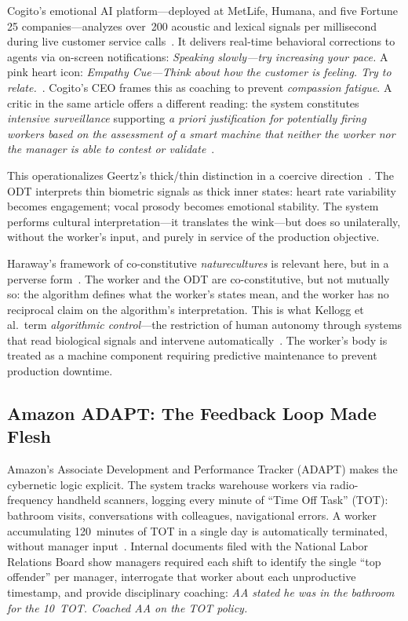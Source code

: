 \documentclass[runningheads]{llncs}
\begin{document}
Cogito's emotional AI platform---deployed at MetLife, Humana, and five Fortune
25 companies---analyzes over~200 acoustic and lexical signals per millisecond
during live customer service calls~\cite{cxtoday2022cogito,cogitostex2025}. It
delivers real-time behavioral corrections to agents via on-screen
notifications: \emph{Speaking slowly---try increasing your pace.} A pink heart
icon: \emph{Empathy Cue---Think about how the customer is feeling. Try to
relate.}~\cite{timecogito2019}. Cogito's CEO frames this as coaching to prevent
\emph{compassion fatigue}. A critic in the same article offers a different
reading: the system constitutes \emph{intensive surveillance} supporting
\emph{a priori justification for potentially firing workers based on the
assessment of a smart machine that neither the worker nor the manager is able to
contest or validate}~\cite{timecogito2019}.

This operationalizes Geertz's thick/thin distinction in a coercive
direction~\cite{geertz1973interpretation}. The ODT interprets thin biometric
signals as thick inner states: heart rate variability becomes engagement; vocal
prosody becomes emotional stability. The system performs cultural
interpretation---it translates the wink---but does so unilaterally, without
the worker's input, and purely in service of the production objective.

Haraway's framework of co-constitutive \emph{naturecultures} is relevant here,
but in a perverse form~\cite{haraway2003companion}. The worker and the ODT are
co-constitutive, but not mutually so: the algorithm defines what the worker's
states mean, and the worker has no reciprocal claim on the algorithm's
interpretation. This is what Kellogg et al.\ term \emph{algorithmic
control}---the restriction of human autonomy through systems that read
biological signals and intervene automatically~\cite{kellogg2020algorithms}.
The worker's body is treated as a machine component requiring predictive
maintenance to prevent production downtime.

\subsection{Amazon ADAPT: The Feedback Loop Made Flesh}

Amazon's Associate Development and Performance Tracker (ADAPT) makes the
cybernetic logic explicit. The system tracks warehouse workers via
radio-frequency handheld scanners, logging every minute of ``Time Off Task''
(TOT): bathroom visits, conversations with colleagues, navigational errors. A
worker accumulating 120~minutes of TOT in a single day is automatically
terminated, without manager input~\cite{vice2022amazon}. Internal documents
filed with the National Labor Relations Board show managers required each shift
to identify the single ``top offender'' per manager, interrogate that worker
about each unproductive timestamp, and provide disciplinary coaching: \emph{AA
stated he was in the bathroom for the 10~TOT. Coached AA on the TOT
policy.}~\cite{vice2022amazon}
\end{document}
